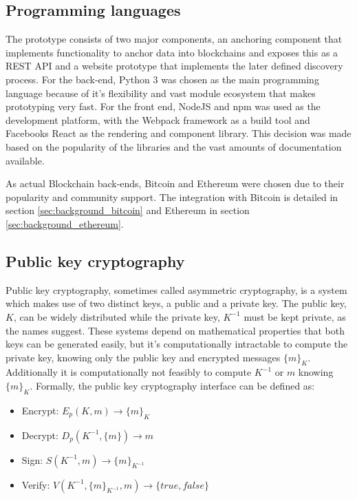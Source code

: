 \documentclass[12pt,msc,a4paper,oneside]{ucl_thesis}
\begin{document}
\subsection{Programming languages}
The prototype consists of two major components, an anchoring component that implements functionality to anchor data into blockchains and exposes this as a REST API and a website prototype that implements the later defined discovery process.
For the back-end, Python 3 was chosen as the main programming language because of it's flexibility and vast module ecosystem that makes prototyping very fast. 
For the front end, NodeJS and npm was used as the development platform, with the Webpack framework as a build tool and Facebooks React as the rendering and component library. This decision was made based on the popularity of the libraries and the vast amounts of documentation available.

As actual Blockchain back-ends, Bitcoin and Ethereum were chosen due to their popularity and community support. The integration with Bitcoin is detailed in section \ref{sec:background_bitcoin} and Ethereum in section \ref{sec:background_ethereum}.

\subsection{Public key cryptography}
Public key cryptography, sometimes called asymmetric cryptography, is a system which makes use of two distinct keys, a public and a private key. The public key, $K$, can be widely distributed while the private key, $K^{-1}$ must be kept private, as the names suggest. These systems depend on mathematical properties that both keys can be generated easily, but it's computationally intractable to compute the private key, knowing only the public key and encrypted messages $\{m\}_K$. Additionally it is computationally not feasibly to compute $K^{-1}$ or $m$ knowing $\{m\}_K$. Formally, the public key cryptography interface can be defined as: \cite{BKarp}
\begin{itemize}
    \item{Encrypt: } $E_p(K, m) \rightarrow \{m\}_K$
    \item{Decrypt: } $D_p(K^{-1}, \{m\}) \rightarrow m$
    \item{Sign: }    $S(K^{-1}, m) \rightarrow \{m\}_{K^{-1}}$
    \item{Verify: }  $V(K^{-1}, \{m\}_{K^{-1}}, m) \rightarrow \{true, false\}$
\end{itemize}
\end{document}
